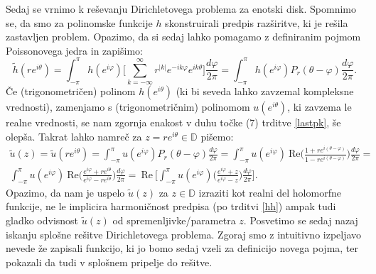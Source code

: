 \documentclass[mat1]{fmfdelo}
\begin{document}
    Sedaj se vrnimo k reševanju Dirichletovega problema za enotski disk. 
    Spomnimo se, da smo za polinomske funkcije $h$ skonstruirali predpis razširitve, ki je rešila zastavljen problem. 
    Opazimo, da si sedaj lahko pomagamo z definiranim pojmom Poissonovega jedra in zapišimo:
    $$
    \widetilde{h}(r e^{i \theta}) = \int_{-\pi}^{\pi}{h(e^{i \varphi}) \bigg[\sum_{k = - \infty}^{\infty} r^{|k|} e^{- i k \varphi} e^{i k \theta}} \bigg]\frac{d \varphi}{2 \pi} = 
    \int_{-\pi}^{\pi}{h(e^{i \varphi}) P_r(\theta - \varphi)\frac{d \varphi}{2 \pi}}.
    $$
    Če (trigonometričen) polinom $h(e^{i\theta})$ (ki  bi seveda lahko zavzemal kompleksne vrednosti), zamenjamo s (trigonometričnim) polinomom $u(e^{i\theta})$, ki zavzema le realne vrednosti, se nam zgornja enakost v duhu 
    točke (7) trditve \ref{lastpk}, še olepša. Takrat lahko namreč za $z = re^{i\theta} \in \mathbb{D}$ pišemo:
    \begin{equation}
        \label{realnidel}
        \begin{split}
            \widetilde{u}(z) = \widetilde{u}(r e^{i \theta}) = \int_{-\pi}^{\pi}{u(e^{i \varphi}) P_r(\theta - \varphi)\frac{d \varphi}{2 \pi}} = \int_{-\pi}^{\pi}{u(e^{i \varphi})~\text{Re}\bigg(\frac{1+re^{i(\theta - \varphi)}}{1-re^{i(\theta - \varphi)}}\bigg)\frac{d \varphi}{2 \pi}}= \\
            \int_{-\pi}^{\pi}{u(e^{i \varphi})~\text{Re}\bigg(\frac{e^{i\varphi}+re^{i\theta}}{e^{i\varphi}-re^{i\theta}}\bigg)\frac{d \varphi}{2 \pi}}=~\text{Re}~\bigg[\int_{-\pi}^{\pi}{u(e^{i \varphi})\bigg(\frac{e^{i\varphi}+z}{e^{i\varphi}-z}\bigg)\frac{d \varphi}{2 \pi}}\bigg].
        \end{split}
    \end{equation}
    Opazimo, da nam je uspelo $\widetilde{u}(z)$ za $z \in \mathbb{D}$ izraziti kot realni del holomorfne funkcije, ne le implicira harmoničnost predpisa (po trditvi \ref{hh}) ampak tudi gladko odvisnost $\widetilde{u}(z)$ od spremenljivke/parametra $z$.
    \newline
    Posvetimo se sedaj nazaj iskanju splošne rešitve Dirichletovega problema. Zgoraj smo z intuitivno izpeljavo nevede že zapisali funkcijo, ki jo bomo sedaj vzeli za definicijo novega pojma, ter pokazali da tudi v splošnem pripelje do rešitve.
\end{document}
